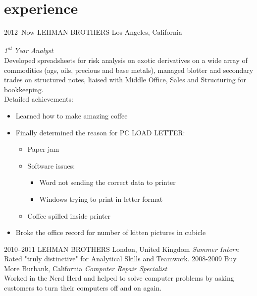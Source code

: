 \documentclass[]{friggeri-cv} %
\begin{document}

\section{experience}

\begin{entrylist}
\entry
{2012--Now}
{LEHMAN BROTHERS}
{Los Angeles, California}
{\emph{1\textsuperscript{st} Year Analyst} \\
Developed spreadsheets for risk analysis on exotic derivatives on a wide array of commodities (ags, oils, precious and base metals), managed blotter and secondary trades on structured notes, liaised with Middle Office, Sales and Structuring for bookkeeping. \\
Detailed achievements:
\begin{itemize}
\item Learned how to make amazing coffee
\item Finally determined the reason for \textsc{PC LOAD LETTER}:
\begin{itemize}
\item Paper jam
\item Software issues:
\begin{itemize}
\item Word not sending the correct data to printer
\item Windows trying to print in letter format
\end{itemize}
\item Coffee spilled inside printer
\end{itemize}
\item Broke the office record for number of kitten pictures in cubicle
\end{itemize}}
\entry
{2010--2011}
{LEHMAN BROTHERS}
{London, United Kingdom}
{\emph{Summer Intern} \\
Rated "truly distinctive" for Analytical Skills and Teamwork.}
\entry
{2008-2009}
{Buy More}
{Burbank, California}
{\emph{Computer Repair Specialist} \\
Worked in the Nerd Herd and helped to solve computer problems by asking customers to turn their computers off and on again.}
\end{entrylist}
\end{document}
